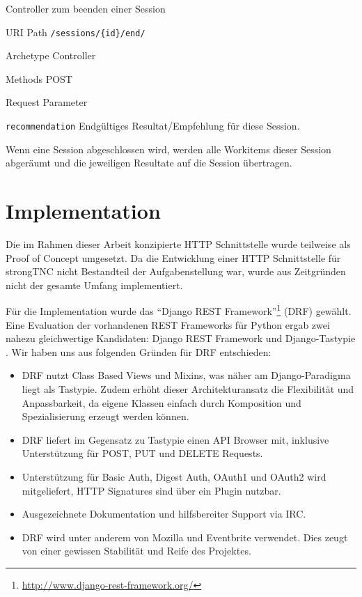 \begin{listing}[H]
\caption{Controller zum beenden einer Session}
\begin{mdframed}[style=def]
\begin{description*}
	\item[URI Path] \texttt{/sessions/\{id\}/end/}
	\item[Archetype] Controller
	\item[Methods] POST
	\item[Request Parameter] \hfill
	\begin{description*}
		\item[\texttt{recommendation}] Endgültiges Resultat/Empfehlung für diese
		Session.
	\end{description*}
\end{description*}
\end{mdframed}
\end{listing}

Wenn eine Session abgeschlossen wird, werden alle Workitems dieser Session
abgeräumt und die jeweiligen Resultate auf die Session übertragen.

\section{Implementation}

Die im Rahmen dieser Arbeit konzipierte HTTP Schnittstelle wurde teilweise als
Proof of Concept umgesetzt. Da die Entwicklung einer HTTP Schnittstelle für
strongTNC nicht Bestandteil der Aufgabenstellung war, wurde aus Zeitgründen
nicht der gesamte Umfang implementiert.

Für die Implementation wurde das \enquote{Django REST
Framework}\footnote{\url{http://www.django-rest-framework.org/}} (DRF) gewählt.
Eine Evaluation der vorhandenen REST Frameworks für Python ergab zwei nahezu
gleichwertige Kandidaten: Django REST Framework und Django-Tastypie
\cite{greenfeld2012rest}. Wir haben uns aus folgenden Gründen für DRF
entschieden:

\begin{itemize}
	\item DRF nutzt Class Based Views und Mixins, was näher am Django-Paradigma
		liegt als Tastypie. Zudem erhöht dieser Architekturansatz die Flexibilität
		und Anpassbarkeit, da eigene Klassen einfach durch Komposition und
		Spezialisierung erzeugt werden können.
	\item DRF liefert im Gegensatz zu Tastypie einen API Browser mit, inklusive
		Unterstützung für POST, PUT und DELETE Requests.
	\item Unterstützung für Basic Auth, Digest Auth, OAuth1 und OAuth2 wird
		mitgeliefert, HTTP Signatures sind über ein Plugin nutzbar.
	\item Ausgezeichnete Dokumentation und hilfsbereiter Support via IRC.
	\item DRF wird unter anderem von Mozilla und Eventbrite verwendet. Dies zeugt
		von einer gewissen Stabilität und Reife des Projektes.
\end{itemize}

